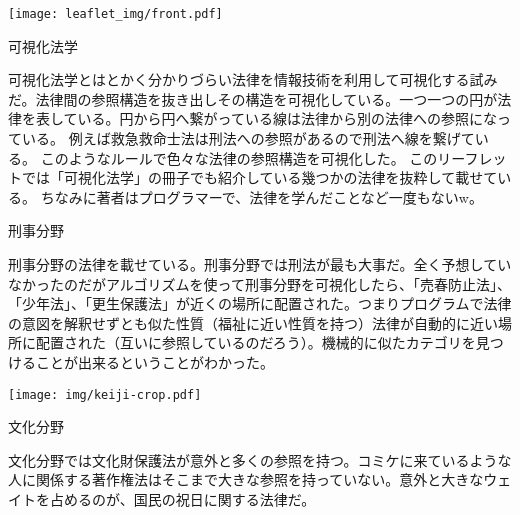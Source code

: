 \documentclass[,a6paper,openany,twoside]{jsarticle}
\begin{document}

\thispagestyle{empty} 
\texttt{[image: leaflet\_img/front.pdf]}

\newpage

\setcounter{page}{1}

{\huge 可視化法学}

可視化法学とはとかく分かりづらい法律を情報技術を利用して可視化する試みだ。法律間の参照構造を抜き出しその構造を可視化している。一つ一つの円が法律を表している。円から円へ繋がっている線は法律から別の法律への参照になっている。
例えば救急救命士法は刑法への参照があるので刑法へ線を繋げている。
このようなルールで色々な法律の参照構造を可視化した。
このリーフレットでは「可視化法学」の冊子でも紹介している幾つかの法律を抜粋して載せている。
ちなみに著者はプログラマーで、法律を学んだことなど一度もないw。




\newpage

{\huge 刑事分野}

刑事分野の法律を載せている。刑事分野では刑法が最も大事だ。全く予想していなかったのだがアルゴリズムを使って刑事分野を可視化したら、「売春防止法」、「少年法」、「更生保護法」が近くの場所に配置された。つまりプログラムで法律の意図を解釈せずとも似た性質（福祉に近い性質を持つ）法律が自動的に近い場所に配置された（互いに参照しているのだろう）。機械的に似たカテゴリを見つけることが出来るということがわかった。

\texttt{[image: img/keiji-crop.pdf]}


{\huge 文化分野}

文化分野では文化財保護法が意外と多くの参照を持つ。コミケに来ているような人に関係する著作権法はそこまで大きな参照を持っていない。意外と大きなウェイトを占めるのが、国民の祝日に関する法律だ。
\end{document}
